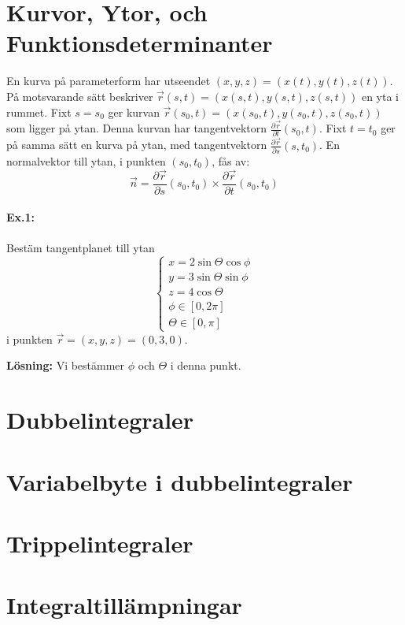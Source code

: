 \documentclass[a4paper,12pt]{article}
\newcommand{\partialfrac}[2]{\frac{\partial #1}{\partial #2}}
\begin{document}
\section{Kurvor, Ytor, och Funktionsdeterminanter}
En kurva på parameterform har utseendet $(x,y,z) = (x(t),y(t),z(t))$. På
motsvarande sätt beskriver $\vec{r}(s,t) = (x(s,t), y(s,t), z(s,t))$
en yta i rummet. Fixt $s = s_0$ ger kurvan
$\vec{r}(s_0,t) = (x(s_0,t), y(s_0,t), z(s_0,t))$ som ligger på ytan.
Denna kurvan har tangentvektorn $\partialfrac{\vec{r}}{t}(s_0,t)$.
Fixt $t = t_0$ ger på samma sätt en kurva på ytan, med tangentvektorn
$\partialfrac{\vec{r}}{s}(s,t_0)$. En normalvektor till ytan, i punkten
$(s_0,t_0)$, fås av:
\begin{equation*}
  \vec{n} =
  \partialfrac{\vec{r}}{s}(s_0,t_0) \times
  \partialfrac{\vec{r}}{t}(s_0,t_0)
\end{equation*}

\paragraph{Ex.1:} Bestäm tangentplanet till ytan
  \begin{equation*}
    \begin{cases}
      x = 2\sin\Theta \cos\phi \\
      y = 3\sin\Theta \sin\phi \\
      z = 4\cos\Theta \\
      \phi \in [0,2\pi] \\
      \Theta \in [0,\pi]
    \end{cases}
  \end{equation*}
  i punkten $\vec{r} = (x,y,z) = (0,3,0)$.

  \textbf{Lösning:} Vi bestämmer $\phi$ och $\Theta$ i denna punkt.

\section{Dubbelintegraler}
\section{Variabelbyte i dubbelintegraler}
\section{Trippelintegraler}
\section{Integraltillämpningar}
\end{document}
